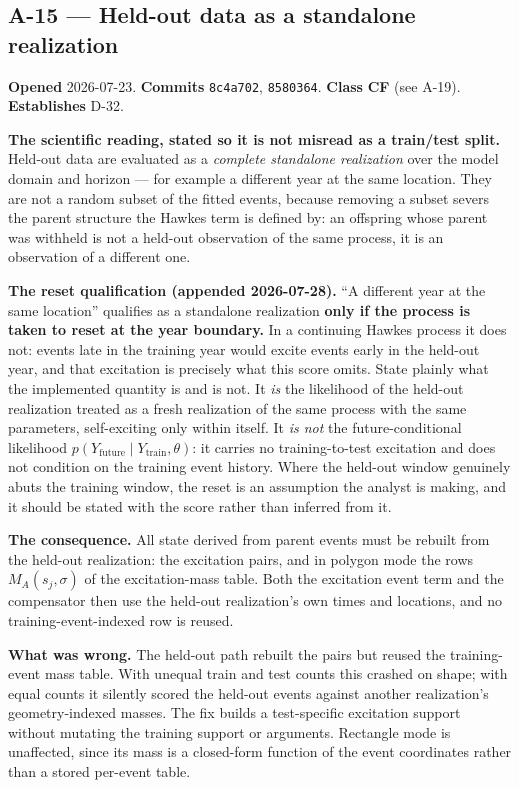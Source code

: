 \documentclass[
  10pt,
]{article}
\begin{document}
\hypertarget{a-15}{%
\subsection{A-15 --- Held-out data as a standalone realization}\label{a-15}}

\textbf{Opened} 2026-07-23. \textbf{Commits} \texttt{8c4a702}, \texttt{8580364}. \textbf{Class} \textbf{CF} (see A-19). \textbf{Establishes} D-32.

\textbf{The scientific reading, stated so it is not misread as a train/test split.} Held-out data are evaluated as a \emph{complete standalone realization} over the model domain and horizon --- for example a different year at the same location. They are not a random subset of the fitted events, because removing a subset severs the parent structure the Hawkes term is defined by: an offspring whose parent was withheld is not a held-out observation of the same process, it is an observation of a different one.

\textbf{The reset qualification (appended 2026-07-28).} ``A different year at the same location'' qualifies as a standalone realization \textbf{only if the process is taken to reset at the year boundary.} In a continuing Hawkes process it does not: events late in the training year would excite events early in the held-out year, and that excitation is precisely what this score omits. State plainly what the implemented quantity is and is not. It \emph{is} the likelihood of the held-out realization treated as a fresh realization of the same process with the same parameters, self-exciting only within itself. It \emph{is not} the future-conditional likelihood \(p(Y_{\text{future}} \mid Y_{\text{train}}, \theta)\): it carries no training-to-test excitation and does not condition on the training event history. Where the held-out window genuinely abuts the training window, the reset is an assumption the analyst is making, and it should be stated with the score rather than inferred from it.

\textbf{The consequence.} All state derived from parent events must be rebuilt from the held-out realization: the excitation pairs, and in polygon mode the rows \(M_A(s_j, \sigma)\) of the excitation-mass table. Both the excitation event term and the compensator then use the held-out realization's own times and locations, and no training-event-indexed row is reused.

\textbf{What was wrong.} The held-out path rebuilt the pairs but reused the training-event mass table. With unequal train and test counts this crashed on shape; with equal counts it silently scored the held-out events against another realization's geometry-indexed masses. The fix builds a test-specific excitation support without mutating the training support or arguments. Rectangle mode is unaffected, since its mass is a closed-form function of the event coordinates rather than a stored per-event table.
\end{document}
